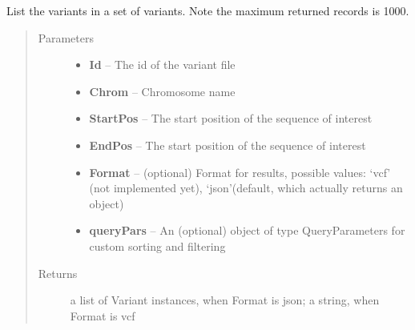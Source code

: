 \documentclass[letterpaper,10pt,english]{sphinxmanual}
\begin{document}
\begin{fulllineitems}
\begin{fulllineitems}
\end{fulllineitems}


\begin{fulllineitems}
\label{Available modules:BaseSpacePy.api.BaseSpaceAPI.BaseSpaceAPI.filterVariantSet}
List the variants in a set of variants. Note the maximum returned records is 1000.
\begin{quote}\begin{description}
\item[{Parameters}] \leavevmode\begin{itemize}
\item {} 
\textbf{Id} -- The id of the variant file

\item {} 
\textbf{Chrom} -- Chromosome name

\item {} 
\textbf{StartPos} -- The start position of the sequence of interest

\item {} 
\textbf{EndPos} -- The start position of the sequence of interest

\item {} 
\textbf{Format} -- (optional) Format for results, possible values: `vcf' (not implemented yet), `json'(default, which actually returns an object)

\item {} 
\textbf{queryPars} -- An (optional) object of type QueryParameters for custom sorting and filtering

\end{itemize}

\item[{Returns}] \leavevmode
a list of Variant instances, when Format is json; a string, when Format is vcf

\end{description}\end{quote}

\end{fulllineitems}



\end{fulllineitems}
\end{document}
